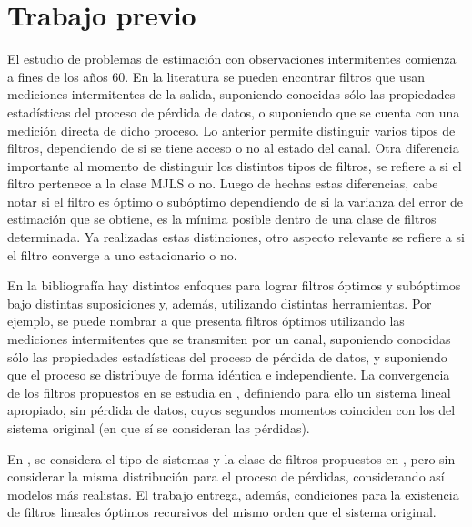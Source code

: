 \newpage 
\section{Trabajo previo}

El estudio de problemas de estimaci\'on con observaciones intermitentes comienza a fines de los a\~nos 60. En la literatura se pueden encontrar filtros que usan mediciones intermitentes de la salida, suponiendo conocidas s\'olo las propiedades estad\'isticas del proceso de p\'erdida de datos, o suponiendo que se cuenta con una medici\'on directa de dicho proceso. Lo anterior permite distinguir varios tipos de filtros, dependiendo de si se tiene acceso o no al estado del canal. Otra diferencia importante al momento de distinguir los distintos tipos de filtros, se refiere a si el filtro pertenece a la clase MJLS o no. Luego de hechas estas diferencias, cabe notar si el filtro es \'optimo o sub\'optimo dependiendo de si la varianza del error de estimaci\'on que se obtiene, es la m\'inima posible dentro de una clase de filtros determinada. Ya realizadas estas distinciones, otro aspecto relevante se refiere a si el filtro converge a uno estacionario o no.

En la bibliograf\'ia hay distintos enfoques para lograr filtros \'optimos y sub\'optimos bajo distintas suposiciones y, adem\'as, utilizando distintas herramientas. Por ejemplo, se puede nombrar a \cite{nahi69} que presenta filtros \'optimos utilizando las mediciones intermitentes que se transmiten por un canal, suponiendo conocidas s\'olo las propiedades estad\'isticas del proceso de p\'erdida de datos, y suponiendo que el proceso se distribuye de forma id\'entica e independiente. La convergencia de los filtros propuestos en \cite{nahi69} se estudia en \cite{tugnai81}, definiendo para ello un sistema lineal apropiado, sin p\'erdida de datos, cuyos segundos momentos coinciden con los del sistema original (en que s\'i se consideran las p\'erdidas).

En \cite{hadsch79}, se considera el tipo de sistemas y la clase de filtros propuestos en \cite{nahi69}, pero sin considerar la misma distribuci\'on para el proceso de p\'erdidas, considerando as\'i modelos m\'as realistas. El trabajo \cite{hadsch79} entrega, adem\'as, condiciones para la existencia de filtros lineales \'optimos recursivos del mismo orden que el sistema original.

